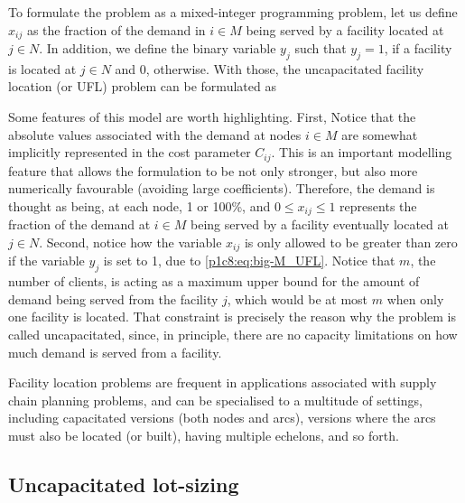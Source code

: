 To formulate the problem as a mixed-integer programming problem, let us define $x_{ij}$ as the fraction of the demand in $i \in M$ being served by a facility located at $j \in N$. In addition, we define the binary variable $y_j$ such that $y_j = 1$, if a facility is located at $j \in N$ and 0, otherwise. With those, the uncapacitated facility location (or UFL) problem can be formulated as 
%

Some features of this model are worth highlighting. First, Notice that the absolute values associated with the demand at nodes $i \in M$ are somewhat implicitly represented in the cost parameter $C_{ij}$. This is an important modelling feature that allows the formulation to be not only stronger, but also more numerically favourable (avoiding large coefficients). Therefore, the demand is thought as being, at each node, 1 or 100\%, and $0 \le x_{ij} \le 1$ represents the fraction of the demand at $i \in M$ being served by a facility eventually located at $j \in N$. Second, notice how the variable $x_{ij}$ is only allowed to be greater than zero if the variable $y_j$ is set to 1, due to \eqref{p1c8:eq:big-M_UFL}. Notice that $m$, the number of clients, is acting as a maximum upper bound for the amount of demand being served from the facility $j$, which would be at most $m$ when only one facility is located. That constraint is precisely the reason why the problem is called uncapacitated, since, in principle, there are no capacity limitations on how much demand is served from a facility. 

Facility location problems are frequent in applications associated with supply chain planning problems, and can be specialised to a multitude of settings, including capacitated versions (both nodes and arcs), versions where the arcs must also be located (or built), having multiple echelons, and so forth. 

 
\subsection{Uncapacitated lot-sizing}

